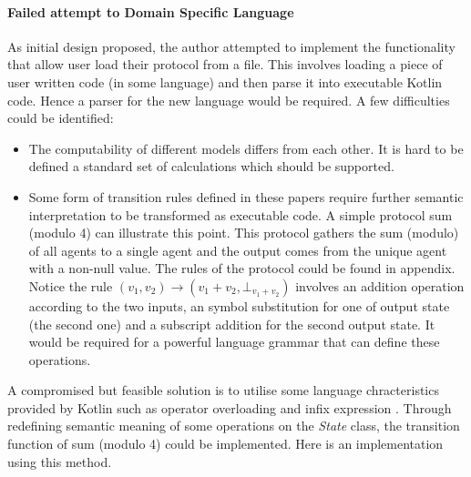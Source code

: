 \paragraph{Failed attempt to Domain Specific Language}
As initial design proposed, the author attempted to implement the functionality that allow user load their protocol from a file.
This involves loading a piece of user written code (in some language) and then parse it into executable Kotlin code. Hence a parser for the new language would be required.
A few difficulties could be identified:
\begin{itemize}
  \item The computability of different models differs from each other. It is hard to be defined a standard set of calculations which should be supported.
  \item Some form of transition rules defined in these papers require further semantic interpretation to be transformed as executable code. A simple protocol
  sum (modulo 4) \cite{AspnesR2007} can illustrate this point. This protocol gathers the sum (modulo) of all agents to a single agent and the output
comes from the unique agent with a non-null value. The rules of the protocol could be found in appendix.
Notice the rule $(v_{1}, v_{2}) \to (v_{1} + v_{2}, \bot_{v_{1} + v_{2}})$ involves an addition operation according to
the two inputs, an symbol substitution for one of output state (the second one) and a subscript addition for the second
output state. It would be required for a powerful language grammar that can define these operations.
\end{itemize}
A compromised but feasible solution is to utilise some language chracteristics provided by Kotlin such as operator overloading and infix expression \cite{Kotlin}.
Through redefining semantic meaning of some operations on the \textit{State} class, the transition function of sum (modulo 4) could be implemented.
Here is an implementation using this method.

